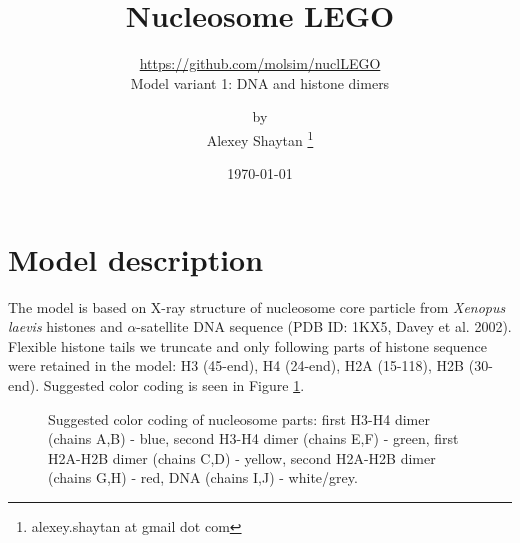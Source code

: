 \documentclass[12pt,onecolumn]{scrartcl}
\title{Nucleosome LEGO} %
\subtitle{\url{https://github.com/molsim/nuclLEGO} \\ Model variant 1: DNA and histone dimers }
\author{by \\ Alexey Shaytan \footnote{alexey.shaytan at gmail dot com}} %
\date{\small{\today}} %
\begin{document}
\maketitle %




\section{Model description}
The model is based on X-ray structure of nucleosome core particle from \textit{Xenopus laevis} histones and $\alpha$-satellite DNA sequence (PDB ID: 1KX5, Davey et al. 2002). Flexible histone tails we truncate and only following parts of histone sequence were retained in the model: H3 (45-end), H4 (24-end), H2A (15-118), H2B (30-end). Suggested color coding is seen in Figure \ref{colorcode}.

\begin{figure}[h]
\begin{center}
\caption{Suggested color coding of nucleosome parts: first H3-H4 dimer (chains A,B) - blue, second H3-H4 dimer (chains E,F) - green, first H2A-H2B dimer (chains C,D) - yellow, second H2A-H2B dimer (chains G,H) - red, DNA (chains I,J) - white/grey.}
\label{colorcode}
\end{center}
\end{figure}
\end{document}
